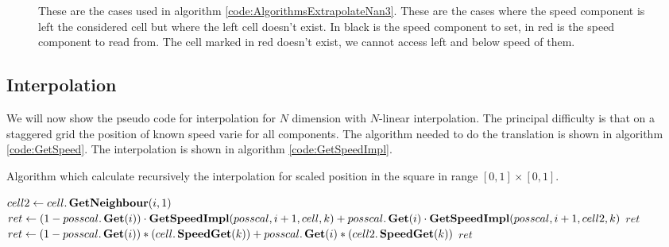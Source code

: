 \begin{figure}
\begin{center}
{
}
\end{center}
\caption{These are the cases used in algorithm \ref{code:AlgorithmsExtrapolateNan3}. These are the cases where the speed component
is left the considered cell but where the left cell doesn't exist. In black is the speed component to set, in red is the speed component to read from. The cell marked in red doesn't exist, we cannot access left and below speed of them.}
\end{figure}
\subsection{Interpolation}

We will now show the pseudo code for interpolation for $N$ dimension with $N$-linear interpolation.
The principal difficulty is that on a staggered grid the position of known speed varie for all components.
The algorithm needed to do the translation is shown in algorithm \ref{code:GetSpeed}.
The interpolation is shown in algorithm \ref{code:GetSpeedImpl}.

\begin{algorithm}
\caption{Algorithm which calculate recursively the interpolation for scaled position in the square in range $[0,1]\times[0,1]$.}
\label{code:GetSpeedImpl}
\begin{algorithmic}[1]
\State $cell2 \gets cell.\mathop{\textbf{GetNeighbour}}(i,1)$
			\State $ret \gets (1-posscal.\mathop{\textbf{Get}}(i))\cdot \mathop{\textbf{GetSpeedImpl}}(posscal,i+1,cell,k)+posscal.\mathop{\textbf{Get}}(i)\cdot \mathop{\textbf{GetSpeedImpl}}(posscal,i+1,cell2,k)$
			\State \Return $ret$
		\Else {}
			\State $ret\gets (1-posscal.\mathop{\textbf{Get}}(i))*(cell.\mathop{\textbf{SpeedGet}}(k))+posscal.\mathop{\textbf{Get}}(i)*(cell2.\mathop{\textbf{SpeedGet}}(k))$
			\State \Return $ret$
		\EndIf
\EndFunction
\end{algorithmic}
\end{algorithm}

